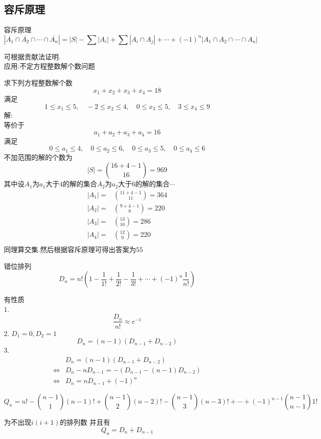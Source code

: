 \subsection{容斥原理}
\begin{theorem}
容斥原理
$$
|\overline{A_1}\cap \overline{A_2} \cap \cdots \cap \overline{A_n}|=|S|-\sum|A_i|+\sum|A_i\cap A_j|+\cdots+(-1)^n|A_1\cap A_2\cap \cdots \cap A_n|
$$
\end{theorem}
可根据贡献法证明.\\
应用:不定方程整数解个数问题
\begin{example}
  求下列方程整数解个数
  $$
  x_1+x_2+x_3+x_4=18
  $$
  满足
  $$
  1\leq x_1 \leq 5 ,\quad -2\leq x_2\leq4,\quad0\leq x_3\leq 5,\quad 3\leq x_4\leq 9
  $$
  解:\\
  等价于
  $$
  a_1+a_2+a_3+a_4=16
  $$
  满足
  $$
  0\leq a_1 \leq 4 ,\quad 0\leq a_2\leq6,\quad0\leq a_3\leq 5,\quad 0\leq a_4\leq 6
  $$
  不加范围的解的个数为
  $$
  |S|=\binom{16+4-1}{16}=969
  $$
  其中设$A_1$为$a_1$大于$4$的解的集合$A_2$为$a_2$大于6的解的集合$\cdots$
  $$
  \begin{aligned}
  |A_1|=&\binom{11+4-1}{11}=364\\
  |A_2|=&\binom{9+4-1}{9}=220\\
  |A_3|=&\binom{13}{10}=286\\
  |A_4|=&\binom{12}{9}=220\\
  \end{aligned}
  $$
  同理算交集.然后根据容斥原理可得出答案为$55$
\end{example}

\begin{proposition}
  错位排列
  $$
  D_n=n!\left(1-\frac{1}{1!}+\frac{1}{2!}-\frac{1}{3!}+\cdots+(-1)^n\frac{1}{n!}\right)
  $$
\end{proposition}
有性质\\
1.$$\frac{D_n}{n!}\approx e^{-1}$$
2.
$D_1=0,D_2=1$
$$
D_n=(n-1)(D_{n-1}+D_{n-2})
$$
3.
$$
\begin{aligned}
&D_n=(n-1)(D_{n-1}+D_{n-2})\\
\iff&D_n-nD_{n-1}=-(D_{n-1}-(n-1)D_{n-2})\\
\iff&D_n=nD_{n-1}+(-1)^n
\end{aligned}
$$

\begin{proposition}
$$ 
 Q_n=n!-\binom{n-1}{1}(n-1)!+\binom{n-1}{2}(n-2)!-\binom{n-1}{3}(n-3)!+\cdots+(-1)^{n-1}\binom{n-1}{n-1}1!
$$
\end{proposition}
为不出现$i(i+1)$的排列数
并且有
$$
Q_n=D_n+D_{n-1}
$$

